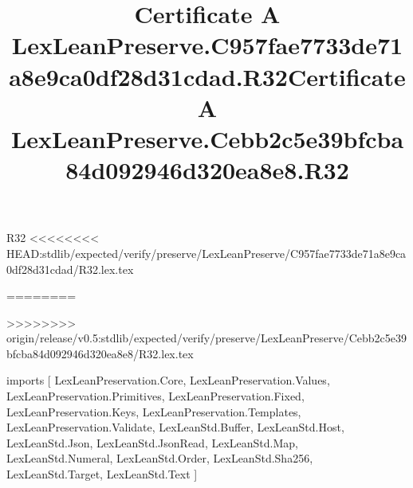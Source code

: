 \begin{lexlean}{R32}
<<<<<<<< HEAD:stdlib/expected/verify/preserve/LexLeanPreserve/C957fae7733de71a8e9ca0df28d31cdad/R32.lex.tex
\title{Certificate A LexLeanPreserve.C957fae7733de71a8e9ca0df28d31cdad.R32}
========
\title{Certificate A LexLeanPreserve.Cebb2c5e39bfcba84d092946d320ea8e8.R32}
>>>>>>>> origin/release/v0.5:stdlib/expected/verify/preserve/LexLeanPreserve/Cebb2c5e39bfcba84d092946d320ea8e8/R32.lex.tex
\begin{coremodule}
imports [
  LexLeanPreservation.Core,
  LexLeanPreservation.Values,
  LexLeanPreservation.Primitives,
  LexLeanPreservation.Fixed,
  LexLeanPreservation.Keys,
  LexLeanPreservation.Templates,
  LexLeanPreservation.Validate,
  LexLeanStd.Buffer,
  LexLeanStd.Host,
  LexLeanStd.Json,
  LexLeanStd.JsonRead,
  LexLeanStd.Map,
  LexLeanStd.Numeral,
  LexLeanStd.Order,
  LexLeanStd.Sha256,
  LexLeanStd.Target,
  LexLeanStd.Text
]


\end{coremodule}
\end{lexlean}
